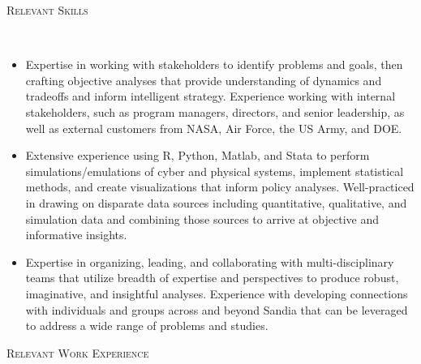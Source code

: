 \documentclass[11pt]{article}
\newenvironment{changemargin}[2]{%
  \begin{list}{}{%
    \setlength{\topsep}{0pt}%
    \setlength{\leftmargin}{#1}%
    \setlength{\rightmargin}{#2}%
    \setlength{\listparindent}{\parindent}%
    \setlength{\itemindent}{\parindent}%
    \setlength{\parsep}{\parskip}%
  }%
  \item[]}{\end{list}
}
\newcommand{\lineover}{
	\begin{changemargin}{-0.05in}{-0.05in}
		\vspace*{-8pt}
		\hrulefill \\
		\vspace*{-2pt}
	\end{changemargin}
}
\newcommand{\header}[1]{
	\begin{changemargin}{-0.5in}{-0.5in}
		\scshape{#1}\\
	\vspace*{-5pt}
  	\lineover
	\end{changemargin}
}
\newenvironment{body} {
	\vspace*{-16pt}
	\begin{changemargin}{-0.25in}{-0.5in}
  }	
	{\end{changemargin}
}
\begin{document}
\header{Relevant Skills}
\begin{body}
	\vspace{14pt}
	\begin{itemize}
		\item Expertise in working with stakeholders to identify problems and goals, then crafting objective analyses that provide understanding of dynamics and tradeoffs and inform intelligent strategy. Experience working with internal stakeholders, such as program managers, directors, and senior leadership, as well as external customers from NASA, Air Force, the US Army, and DOE.
		\item Extensive experience using R, Python, Matlab, and Stata to perform simulations/emulations of cyber and physical systems, implement statistical methods, and create visualizations that inform policy analyses.  Well-practiced in drawing on disparate data sources including quantitative, qualitative, and simulation data and combining those sources to arrive at objective and informative insights.
		\item Expertise in organizing, leading, and collaborating with multi-disciplinary teams that utilize breadth of expertise and perspectives to produce robust, imaginative, and insightful analyses. Experience with developing connections with individuals and groups across and beyond Sandia that can be leveraged to address a wide range of problems and studies.
	\end{itemize}
\end{body}

\header{Relevant Work Experience}
\end{document}
